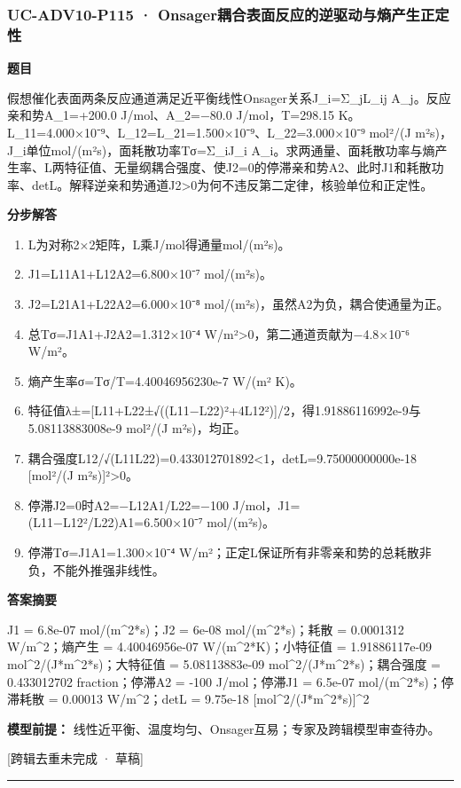 \documentclass[UTF8,11pt,a4paper]{ctexart}
\begin{document}
\subsubsection*{UC-ADV10-P115 · Onsager耦合表面反应的逆驱动与熵产生正定性}
\noindent\textbf{题目}\par
假想催化表面两条反应通道满足近平衡线性Onsager关系J\_i=Σ\_jL\_ij A\_j。反应亲和势A\_1=+200.0 J/mol、A\_2=−80.0 J/mol，T=298.15 K。L\_11=4.000×10⁻⁹、L\_12=L\_21=1.500×10⁻⁹、L\_22=3.000×10⁻⁹ mol²/(J m²s)，J\_i单位mol/(m²s)，面耗散功率Tσ=Σ\_iJ\_i A\_i。求两通量、面耗散功率与熵产生率、L两特征值、无量纲耦合强度、使J2=0的停滞亲和势A2、此时J1和耗散功率、detL。解释逆亲和势通道J2>0为何不违反第二定律，核验单位和正定性。\par
\medskip\noindent\textbf{分步解答}
\begin{enumerate}
\item L为对称2×2矩阵，L乘J/mol得通量mol/(m²s)。
\item J1=L11A1+L12A2=6.800×10⁻⁷ mol/(m²s)。
\item J2=L21A1+L22A2=6.000×10⁻⁸ mol/(m²s)，虽然A2为负，耦合使通量为正。
\item 总Tσ=J1A1+J2A2=1.312×10⁻⁴ W/m²>0，第二通道贡献为−4.8×10⁻⁶ W/m²。
\item 熵产生率σ=Tσ/T=4.40046956230e-7 W/(m² K)。
\item 特征值λ±=[L11+L22±√((L11−L22)²+4L12²)]/2，得1.91886116992e-9与5.08113883008e-9 mol²/(J m²s)，均正。
\item 耦合强度L12/√(L11L22)=0.433012701892<1，detL=9.75000000000e-18 [mol²/(J m²s)]²>0。
\item 停滞J2=0时A2=−L12A1/L22=−100 J/mol，J1=(L11−L12²/L22)A1=6.500×10⁻⁷ mol/(m²s)。
\item 停滞Tσ=J1A1=1.300×10⁻⁴ W/m²；正定L保证所有非零亲和势的总耗散非负，不能外推强非线性。
\end{enumerate}
\noindent\textbf{答案摘要}\par
J1 = 6.8e-07 mol/(m\textasciicircum{}2*s)；J2 = 6e-08 mol/(m\textasciicircum{}2*s)；耗散 = 0.0001312 W/m\textasciicircum{}2；熵产生 = 4.40046956e-07 W/(m\textasciicircum{}2*K)；小特征值 = 1.91886117e-09 mol\textasciicircum{}2/(J*m\textasciicircum{}2*s)；大特征值 = 5.08113883e-09 mol\textasciicircum{}2/(J*m\textasciicircum{}2*s)；耦合强度 = 0.433012702 fraction；停滞A2 = -100 J/mol；停滞J1 = 6.5e-07 mol/(m\textasciicircum{}2*s)；停滞耗散 = 0.00013 W/m\textasciicircum{}2；detL = 9.75e-18 [mol\textasciicircum{}2/(J*m\textasciicircum{}2*s)]\textasciicircum{}2\par
\noindent\textbf{模型前提：}
线性近平衡、温度均匀、Onsager互易；专家及跨辑模型审查待办。\par
\noindent\textcolor{red!65!black}{[跨辑去重未完成 · 草稿]} \par
\medskip\hrule\medskip
{}
\end{document}

